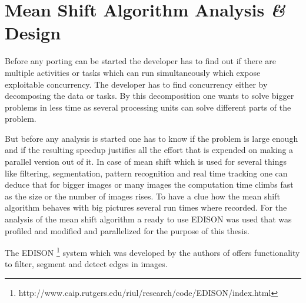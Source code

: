 \chapter{Mean Shift Algorithm Analysis \textit{\&} Design} %
\label{ch:algorithm_analysis}
Before any porting can be started the developer has to find out if there are
multiple activities or tasks which can run simultaneously which expose
exploitable concurrency. The developer has to find concurrency either by
decomposing the data or tasks. By this decomposition one wants to solve bigger
problems in less time as several processing units can solve different parts of
the problem.

But before any analysis is started one has to know if the problem is large
enough and if the resulting speedup justifies all the effort that is expended on
making a parallel version out of it. In case of mean shift which is used for
several things like filtering, segmentation, pattern recognition and real time
tracking one can deduce that for bigger images or many images the computation
time climbs fast as the size or the number of images rises. To have a clue how
the mean shift algorithm behaves with big pictures several run times where
recorded. For the analysis of the mean shift algorithm a ready to use
\gls{EDISON} was used that was profiled and modified and parallelized for the
purpose of this thesis.

The \gls{EDISON}
\footnote{http://www.caip.rutgers.edu/riul/research/code/EDISON/index.html}
system which was developed by the authors
\citeauthor{citeulike:462300} of \citep{citeulike:462300} offers
functionality to filter, segment and detect edges in images.
 
